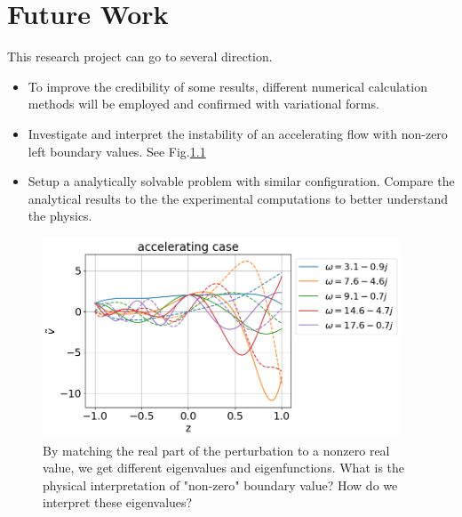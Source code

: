 \chapter{Future Work}
This research project can go to several direction. 

\begin{itemize}
  \item To improve the credibility of some results, different numerical calculation methods will be employed and confirmed with variational forms.
  \item Investigate and interpret the instability of an accelerating flow with non-zero left boundary values. See Fig.\ref{fig:accelerating-v-nonzero-bc}
  \item Setup a analytically solvable problem with similar configuration. Compare the analytical results to the the experimental computations to better understand the physics.
\end{itemize}

\begin{figure}[htbp]
  \centering
  \includegraphics[width=0.95\textwidth]{figures/numerical-experiments/accelerating-v-nonzero-bc}
  \caption{By matching the real part of the perturbation to a nonzero real value, we get different eigenvalues and eigenfunctions. What is the physical interpretation of "non-zero" boundary value? How do we interpret these eigenvalues?}
  \label{fig:accelerating-v-nonzero-bc}
\end{figure}

